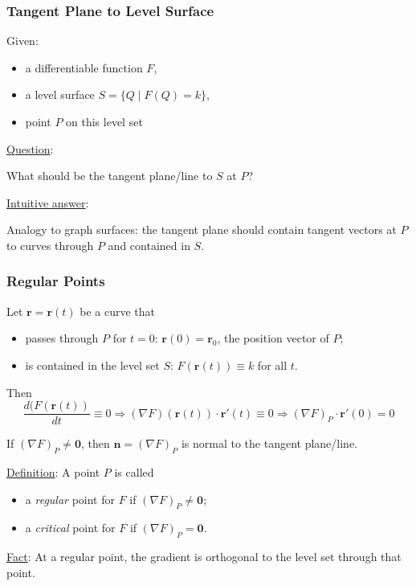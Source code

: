 \begin{frame}
  \frametitle{Tangent Plane to Level Surface}

Given:
  \begin{itemize}
    \item a differentiable function $F$,
    \item a level surface $S=\{ Q\; | \; F(Q) = k\}$,
    \item point $P$ on this level set
  \end{itemize}

\underline{Question}:

\begin{center}
  What should be the tangent plane/line to $S$ at $P$?
\end{center}


\pause
\underline{Intuitive answer}:

Analogy to graph surfaces: the tangent plane should contain tangent vectors at $P$ to curves through $P$ and contained in $S$.
\end{frame}

\begin{frame}
  \frametitle{Regular Points}

 Let $\textbf{r}=\textbf{r}(t)$ be a curve that
%
\begin{itemize}
  \item passes through $P$ for $t=0$: $\textbf{r}(0) = \textbf{r}_0$, the position vector of $P$;
  \item is contained in the level set $S$: $F(\textbf{r}(t)) \equiv k$ for all $t$.
\end{itemize}

Then
%
$$ \frac{d(F(\textbf{r}(t))}{dt} \equiv 0 \Longrightarrow (\nabla F)(\textbf{r}(t)) \cdot \textbf{r}'(t) \equiv 0 \Longrightarrow (\nabla F)_P \cdot \textbf{r}'(0) =0$$

\pause
If $(\nabla F)_P \neq \textbf{0}$, then $\textbf{n}= (\nabla F)_P$ is normal to the tangent plane/line.

\pause
\medskip
\underline{Definition}: A point $P$ is called
\begin{itemize}
  \item a \emph{regular} point for $F$ if $(\nabla F)_P \neq \textbf{0}$;
  \item a \emph{critical} point for $F$ if $(\nabla F)_P = \textbf{0}$.
\end{itemize}

\pause
\medskip
\underline{Fact}: At a regular point, the gradient is orthogonal to the level set through that point.
\end{frame}


